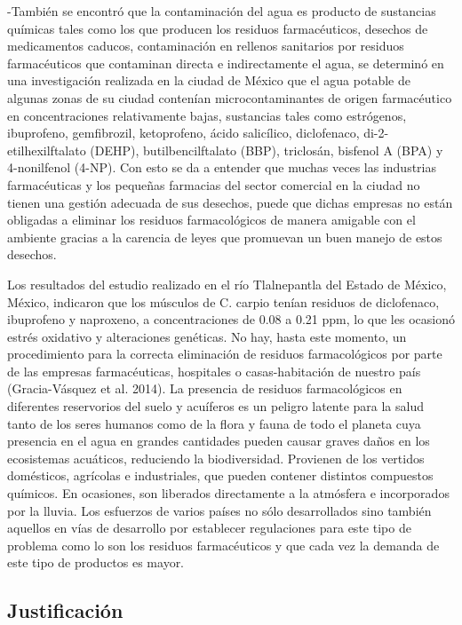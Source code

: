 -También se encontró que la contaminación del agua es producto de sustancias químicas tales como los que producen los residuos farmacéuticos, desechos de medicamentos caducos, contaminación en rellenos sanitarios por residuos farmacéuticos que contaminan directa e indirectamente el agua, se determinó en una investigación realizada en la ciudad de México que el agua potable de algunas zonas de su ciudad contenían microcontaminantes de origen farmacéutico en concentraciones relativamente bajas, sustancias tales como estrógenos, ibuprofeno, gemfibrozil, ketoprofeno, ácido salicílico, diclofenaco, di-2-etilhexilftalato (DEHP), butilbencilftalato (BBP), triclosán, bisfenol A (BPA) y 4-nonilfenol (4-NP). Con esto se da a entender que muchas veces las industrias farmacéuticas y los pequeñas farmacias del sector comercial en la ciudad no tienen una gestión adecuada de sus desechos, puede que dichas empresas no están obligadas a eliminar los residuos farmacológicos de manera amigable con el ambiente gracias a la carencia de leyes que promuevan un buen manejo de estos desechos.

Los resultados del estudio realizado en el río Tlalnepantla del Estado de México, México, indicaron que los músculos de C. carpio tenían residuos de diclofenaco, ibuprofeno y naproxeno, a concentraciones de 0.08 a 0.21 ppm, lo que les ocasionó estrés oxidativo y alteraciones genéticas. No hay, hasta este momento, un procedimiento para la correcta eliminación de residuos farmacológicos por parte de las empresas farmacéuticas, hospitales o casas-habitación de nuestro país (Gracia-Vásquez et al. 2014). La presencia de residuos farmacológicos en diferentes reservorios del suelo y acuíferos es un peligro latente para la salud tanto de los seres humanos como de la flora y fauna de todo el planeta cuya presencia en el agua en grandes cantidades pueden causar graves daños en los ecosistemas acuáticos, reduciendo la biodiversidad. Provienen de los vertidos domésticos, agrícolas e industriales, que pueden contener distintos compuestos químicos. En ocasiones, son liberados directamente a la atmósfera e incorporados por la lluvia. Los esfuerzos de varios países no sólo desarrollados sino también aquellos en vías de desarrollo por establecer regulaciones para este tipo de problema como lo son los residuos farmacéuticos y que cada vez la demanda de este tipo de productos es mayor.
\subsection{Justificación}

